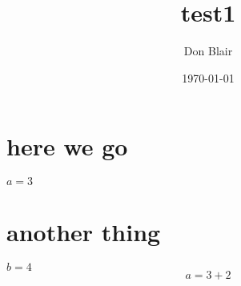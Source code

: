 \documentclass[11pt]{article}
\title{test1}
\author{Don Blair}
\date{\today}
\begin{document}
\maketitle

\setcounter{tocdepth}{3}
\tableofcontents
\vspace*{1cm}
\section{here we go}
\label{sec-1}

$a=3$
\section{another thing}
\label{sec-2}

$b=4$
\begin{equation}
a=3+2
\end{equation}
\end{document}
